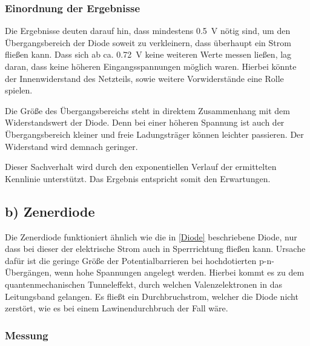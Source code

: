 \documentclass[11pt,a4paper,titlepage, ngerman]{article}
\begin{document}
			\subsubsection*{Einordnung der Ergebnisse}
							
				Die Ergebnisse deuten darauf hin, dass mindestens \SI{0.5}{\volt} nötig sind, um den Übergangsbereich der Diode soweit zu verkleinern, dass überhaupt ein Strom fließen kann. 				
				Dass sich ab ca. \SI{0.72}{\volt} keine weiteren Werte messen  ließen, lag daran, dass keine höheren Eingangsspannungen möglich waren. Hierbei könnte der Innenwiderstand des Netzteils, sowie weitere Vorwiderstände eine Rolle spielen.

				Die Größe des Übergangsbereichs steht in direktem Zusammenhang mit dem Widerstandswert der Diode.
				Denn bei einer höheren Spannung ist auch der Übergangsbereich kleiner und freie Ladungsträger können leichter passieren.
				Der Widerstand wird demnach geringer.
				
				Dieser Sachverhalt wird durch den exponentiellen Verlauf der ermittelten Kennlinie unterstützt.
				Das Ergebnis entspricht somit den Erwartungen.
				
		\subsection{b) Zenerdiode} 
			
			Die Zenerdiode funktioniert ähnlich wie die in \ref{Diode} beschriebene Diode, nur dass bei dieser der elektrische Strom auch in Sperrrichtung fließen kann.
			Ursache dafür ist die geringe Größe der Potentialbarrieren bei hochdotierten p-n-Übergängen, wenn hohe Spannungen angelegt werden.
			Hierbei kommt es zu dem quantenmechanischen Tunneleffekt, durch welchen Valenzelektronen in das Leitungsband gelangen.
			Es fließt ein Durchbruchstrom, welcher die Diode nicht zerstört, wie es bei einem Lawinendurchbruch der Fall wäre.
			
			\subsubsection*{Messung}
			
\end{document}
